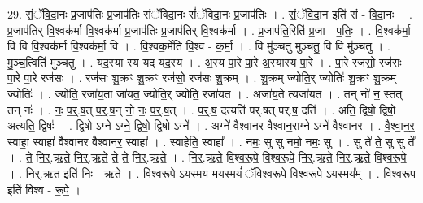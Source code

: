 \documentclass[17pt]{extarticle}
\begin{document}
29. सं॒ॅवि॒दा॒नः प्र॒जाप॑तिः प्र॒जाप॑तिः संॅविदा॒नः सं॑ॅविदा॒नः प्र॒जाप॑तिः । . सं॒ॅवि॒दा॒न इति॑ सं - वि॒दा॒नः । . प्र॒जाप॑तिर् वि॒श्वक॑र्मा वि॒श्वक॑र्मा प्र॒जाप॑तिः प्र॒जाप॑तिर् वि॒श्वक॑र्मा । . प्र॒जाप॑ति॒रिति॑ प्र॒जा - प॒तिः॒ । . वि॒श्वक॑र्मा॒ वि वि वि॒श्वक॑र्मा वि॒श्वक॑र्मा॒ वि । . वि॒श्वक॒र्मेति॑ वि॒श्व - क॒र्मा॒ । . वि मु॑ञ्चतु मुञ्चतु॒ वि वि मु॑ञ्चतु । . मु॒ञ्च॒त्विति॑ मुञ्चतु । . यद॒स्या स्य यद् यद॒स्य । . अ॒स्य पा॒रे पा॒रे अ॒स्यास्य पा॒रे । . पा॒रे रज॑सो॒ रज॑सः पा॒रे पा॒रे रज॑सः । . रज॑सः शु॒क्रꣳ शु॒क्रꣳ रज॑सो॒ रज॑सः शु॒क्रम् । . शु॒क्रम् ज्योति॒र् ज्योतिः॑ शु॒क्रꣳ शु॒क्रम् ज्योतिः॑ । . ज्योति॒ रजा॑य॒ता जा॑यत॒ ज्योति॒र् ज्योति॒ रजा॑यत । . अजा॑य॒ते त्यजा॑यत । . तन् नो॑ न॒ स्तत् तन् नः॑ । . नः॒ प॒र्॒.ष॒त् प॒र्॒.ष॒न् नो॒ नः॒ प॒र्॒.ष॒त् । . प॒र्॒.ष॒ दत्यति॑ पर्.षत् पर्.ष॒ दति॑ । . अति॒ द्विषो॒ द्विषो॒ अत्यति॒ द्विषः॑ । . द्विषो ऽग्ने ऽग्ने॒ द्विषो॒ द्विषो ऽग्ने᳚ । . अग्ने॑ वैश्वानर वैश्वान॒राग्ने ऽग्ने॑ वैश्वानर । . वै॒श्वा॒न॒र॒ स्वाहा॒ स्वाहा॑ वैश्वानर वैश्वानर॒ स्वाहा᳚ । . स्वाहेति॒ स्वाहा᳚ । . नमः॒ सु सु नमो॒ नमः॒ सु । . सु ते॑ ते॒ सु सु ते᳚ । . ते॒ नि॒र्॒.ऋ॒ते॒ नि॒र्॒.ऋ॒ते॒ ते॒ ते॒ नि॒र्॒.ऋ॒ते॒ । . नि॒र्॒.ऋ॒ते॒ वि॒श्व॒रू॒पे॒ वि॒श्व॒रू॒पे॒ नि॒र्॒.ऋ॒ते॒ नि॒र्॒.ऋ॒ते॒ वि॒श्व॒रू॒पे॒ । . नि॒र्॒.ऋ॒त॒ इति॑ निः - ऋ॒ते॒ । . वि॒श्व॒रू॒पे॒ ऽय॒स्मय॑ मय॒स्मयं॑ ॅविश्वरूपे विश्वरूपे ऽय॒स्मय᳚म् । . वि॒श्व॒रू॒प॒ इति॑ विश्व - रू॒पे॒ । \newline
\end{document}
